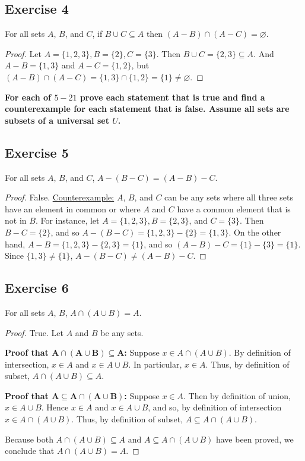\documentclass[14pt]{extarticle}
\newcommand{\es}{\varnothing}
\newcommand{\cy}{\color{cyan}}
\begin{document}
\subsection{Exercise 4}
For all sets $A$, $B$, and $C$, if \(B \cup C \subseteq A\) then \((A - B) \cap (A - C) = \es\).

\begin{proof}
  Let \(A = \{1, 2, 3\}, B = \{2\}, C = \{3\}\). Then \(B \cup C = \{2, 3\} \subseteq A\). And \(A - B = \{1, 3\}\)
  and \(A - C = \{1, 2\}\), but \((A - B) \cap (A - C) = \{1, 3\} \cap \{1, 2\} = \{1\} \neq \es\).
\end{proof}

{\bf \cy For each of $5-21$ prove each statement that is true and find a counterexample for each statement that is false. Assume all sets are subsets of a universal set $U$.}

\subsection{Exercise 5}
For all sets $A$, $B$, and $C$, \(A - (B - C) = (A - B) - C\).

\begin{proof}
  False. \underline{Counterexample:} $A$, $B$, and $C$ can be any sets where all three sets have an element in common or
  where $A$ and $C$ have a common element that is not in $B$. For instance, let \(A = \{1, 2, 3\}, B = \{2, 3\}\), and
  \(C = \{3\}\). Then \(B - C = \{2\}\), and so \(A - (B - C) = \{1, 2, 3\} - \{2\} = \{1, 3\}\). On the other hand,
  \(A - B = \{1, 2, 3\} - \{2, 3\} = \{1\}\), and so \((A - B) - C = \{1\} - \{3\} = \{1\}\).
  Since \(\{1, 3\} \neq \{1\}\), \(A-(B-C) \neq (A-B)-C\).
\end{proof}

\subsection{Exercise 6}
For all sets $A$, $B$, \(A \cap (A \cup B) = A\).

\begin{proof}
  True. Let $A$ and $B$ be any sets.

    {\bf Proof that \(\bm{A \cap (A \cup B) \subseteq A}\):} Suppose \(x \in A \cap (A \cup B)\). By definition of
  intersection, $x \in A$ and \(x \in A \cup B\). In particular, $x \in A$. Thus, by definition of subset,
  \(A \cap (A \cup B) \subseteq A\).

    {\bf Proof that \(\bm{A \subseteq A \cap (A \cup B)}\):} Suppose $x \in A$. Then by definition of union, \(x \in A \cup B\).
  Hence $x \in A$ and \(x \in A \cup B\), and so, by definition of intersection \(x \in A \cap (A \cup B)\).
  Thus, by definition of subset, \(A \subseteq A \cap (A \cup B)\).

  Because both \(A \cap (A \cup B) \subseteq A\) and \(A \subseteq A \cap (A \cup B)\) have been proved, we conclude
  that \(A \cap (A \cup B) = A\).
\end{proof}
\end{document}
